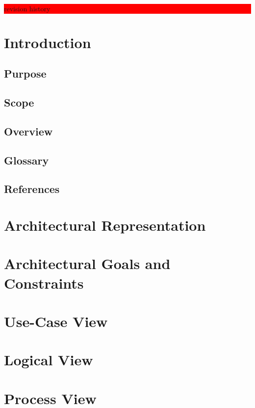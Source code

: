 \documentclass{article}
\title{\todo{PhysioMIST Design Crap}}
\author{Mark Caral, Sara Cummins, BarbaraJoy Jones, Joshua Lee}
\date{October 23, 2009\\{\sc Eecs} 393}
\newcommand{\todo}[1]{\colorbox{red}{\begin{minipage}{\textwidth}{#1}\end{minipage}}}
\begin{document}
\begin{titlepage}
\maketitle\thispagestyle{empty}
\end{titlepage}

\todo{revision history}
\newpage

\tableofcontents
\newpage

\section{Introduction}
\subsection{Purpose}
\subsection{Scope}
\subsection{Overview}
\subsection{Glossary}
\subsection{References}

\section{Architectural Representation}

\section{Architectural Goals and Constraints}

\section{Use-Case View}

\section{Logical View}

\section{Process View}
\end{document}
